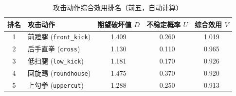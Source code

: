 \begin{table}[H]
\centering
\caption{攻击动作综合效用排名（前五，自动计算）}
\begin{tabular}{c l c c c}
\toprule
排名 & 攻击动作 & 期望破坏值 $D$ & 不稳定概率 $U$ & 综合效用 $V$ \\
\midrule
1 & 前蹬腿 (\texttt{front\_kick}) & 1.409 & 0.260 & 1.019 \\
2 & 后手直拳 (\texttt{cross}) & 1.130 & 0.110 & 0.965 \\
3 & 低扫腿 (\texttt{low\_kick}) & 1.181 & 0.170 & 0.926 \\
4 & 回旋踢 (\texttt{roundhouse}) & 1.475 & 0.370 & 0.920 \\
5 & 上勾拳 (\texttt{uppercut}) & 1.288 & 0.250 & 0.913 \\
\bottomrule
\end{tabular}
\end{table}
